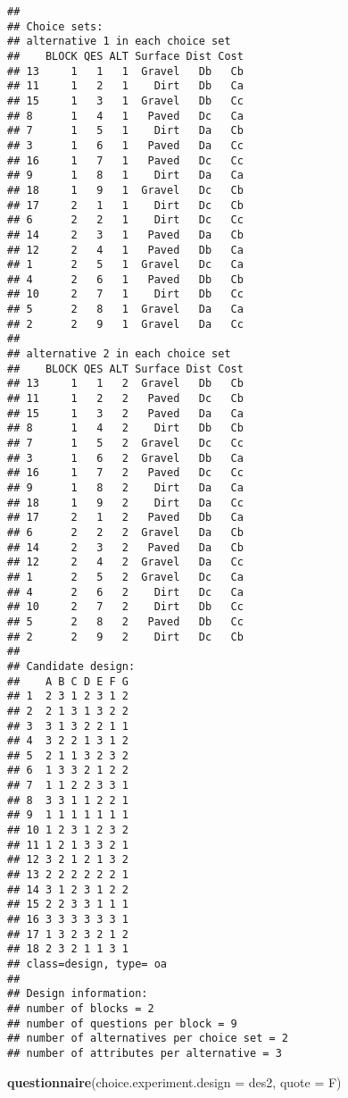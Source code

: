 \documentclass[
]{article}
\newenvironment{Shaded}{\begin{snugshade}}{\end{snugshade}}
\newcommand{\DataTypeTok}[1]{\textcolor[rgb]{0.13,0.29,0.53}{#1}}
\newcommand{\KeywordTok}[1]{\textcolor[rgb]{0.13,0.29,0.53}{\textbf{#1}}}
\newcommand{\NormalTok}[1]{#1}
\begin{document}
\begin{verbatim}
## 
## Choice sets:
## alternative 1 in each choice set
##    BLOCK QES ALT Surface Dist Cost
## 13     1   1   1  Gravel   Db   Cb
## 11     1   2   1    Dirt   Db   Ca
## 15     1   3   1  Gravel   Db   Cc
## 8      1   4   1   Paved   Dc   Ca
## 7      1   5   1    Dirt   Da   Cb
## 3      1   6   1   Paved   Da   Cc
## 16     1   7   1   Paved   Dc   Cc
## 9      1   8   1    Dirt   Da   Ca
## 18     1   9   1  Gravel   Dc   Cb
## 17     2   1   1    Dirt   Dc   Cb
## 6      2   2   1    Dirt   Dc   Cc
## 14     2   3   1   Paved   Da   Cb
## 12     2   4   1   Paved   Db   Ca
## 1      2   5   1  Gravel   Dc   Ca
## 4      2   6   1   Paved   Db   Cb
## 10     2   7   1    Dirt   Db   Cc
## 5      2   8   1  Gravel   Da   Ca
## 2      2   9   1  Gravel   Da   Cc
## 
## alternative 2 in each choice set
##    BLOCK QES ALT Surface Dist Cost
## 13     1   1   2  Gravel   Db   Cb
## 11     1   2   2   Paved   Dc   Cb
## 15     1   3   2   Paved   Da   Ca
## 8      1   4   2    Dirt   Db   Cb
## 7      1   5   2  Gravel   Dc   Cc
## 3      1   6   2  Gravel   Db   Ca
## 16     1   7   2   Paved   Dc   Cc
## 9      1   8   2    Dirt   Da   Ca
## 18     1   9   2    Dirt   Da   Cc
## 17     2   1   2   Paved   Db   Ca
## 6      2   2   2  Gravel   Da   Cb
## 14     2   3   2   Paved   Da   Cb
## 12     2   4   2  Gravel   Da   Cc
## 1      2   5   2  Gravel   Dc   Ca
## 4      2   6   2    Dirt   Dc   Ca
## 10     2   7   2    Dirt   Db   Cc
## 5      2   8   2   Paved   Db   Cc
## 2      2   9   2    Dirt   Dc   Cb
## 
## Candidate design:
##    A B C D E F G
## 1  2 3 1 2 3 1 2
## 2  2 1 3 1 3 2 2
## 3  3 1 3 2 2 1 1
## 4  3 2 2 1 3 1 2
## 5  2 1 1 3 2 3 2
## 6  1 3 3 2 1 2 2
## 7  1 1 2 2 3 3 1
## 8  3 3 1 1 2 2 1
## 9  1 1 1 1 1 1 1
## 10 1 2 3 1 2 3 2
## 11 1 2 1 3 3 2 1
## 12 3 2 1 2 1 3 2
## 13 2 2 2 2 2 2 1
## 14 3 1 2 3 1 2 2
## 15 2 2 3 3 1 1 1
## 16 3 3 3 3 3 3 1
## 17 1 3 2 3 2 1 2
## 18 2 3 2 1 1 3 1
## class=design, type= oa 
## 
## Design information:
## number of blocks = 2 
## number of questions per block = 9 
## number of alternatives per choice set = 2 
## number of attributes per alternative = 3
\end{verbatim}

\begin{Shaded}
\begin{Highlighting}[]
\KeywordTok{questionnaire}\NormalTok{(}\DataTypeTok{choice.experiment.design =}\NormalTok{ des2, }\DataTypeTok{quote =}\NormalTok{ F)}
\end{Highlighting}
\end{Shaded}
\end{document}
